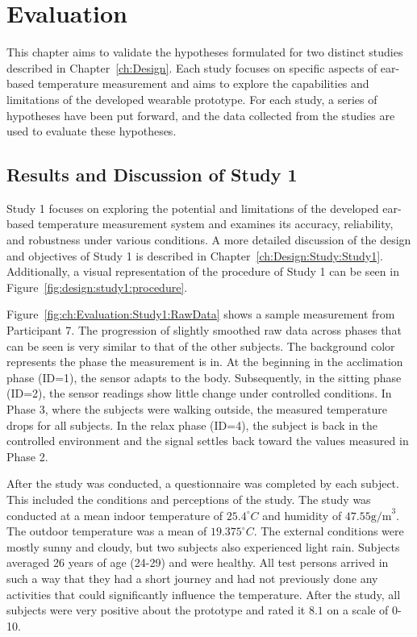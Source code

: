 \chapter{Evaluation}
\label{ch:Evaluation}
This chapter aims to validate the hypotheses formulated for two distinct studies described in Chapter~\ref{ch:Design}. 
Each study focuses on specific aspects of ear-based temperature measurement and aims to explore the capabilities and limitations of the developed wearable prototype. 
For each study, a series of hypotheses have been put forward, and the data collected from the studies are used to evaluate these hypotheses.

\section{Results and Discussion of Study 1}
\label{sec:Evaluation:Study1}
Study 1 focuses on exploring the potential and limitations of the developed ear-based temperature measurement system and examines its accuracy, reliability, and robustness under various conditions. 
A more detailed discussion of the design and objectives of Study 1 is described in Chapter~\ref{ch:Design:Study:Study1}.
Additionally, a visual representation of the procedure of Study 1 can be seen in Figure~\ref{fig:design:study1:procedure}.

Figure~\ref{fig:ch:Evaluation:Study1:RawData} shows a sample measurement from Participant 7.
The progression of slightly smoothed raw data across phases that can be seen is very similar to that of the other subjects. 
The background color represents the phase the measurement is in.
At the beginning in the acclimation phase (ID=1), the sensor adapts to the body. 
Subsequently, in the sitting phase (ID=2), the sensor readings show little change under controlled conditions.
In Phase 3, where the subjects were walking outside, the measured temperature drops for all subjects.
In the relax phase (ID=4), the subject is back in the controlled environment and the signal settles back toward the values measured in Phase 2.

After the study was conducted, a questionnaire was completed by each subject. 
This included the conditions and perceptions of the study. 
The study was conducted at a mean indoor temperature of $25.4 ^\circ C$ and humidity of $47.55 \text{g/m}^3$. 
The outdoor temperature was a mean of $19.375 ^\circ C$.
The external conditions were mostly sunny and cloudy, but two subjects also experienced light rain.
Subjects averaged 26 years of age (24-29) and were healthy.
All test persons arrived in such a way that they had a short journey and had not previously done any activities that could significantly influence the temperature.
After the study, all subjects were very positive about the prototype and rated it $8.1$ on a scale of 0-10.

